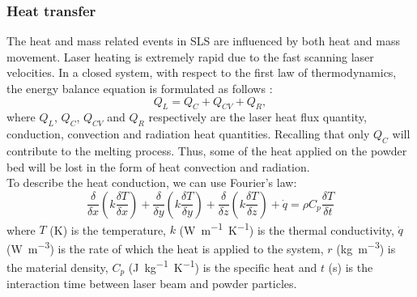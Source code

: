 \subsubsection{Heat transfer}
\label{sssec:heattransfer}
The heat and mass related events in SLS are influenced by both heat and mass movement. Laser heating is extremely rapid due to the fast scanning laser velocities. In a closed system, with respect to the first law of thermodynamics, the energy balance equation is formulated as follows \cite{bouabbou_understanding_2022}:
\begin{equation}
    \label{eq:tutteQ}
    Q_L = Q_C + Q_{CV} + Q_R,
\end{equation}
where $Q_L$, $Q_C$, $Q_{CV}$ and $Q_R$ respectively are the laser heat flux quantity, conduction, convection and radiation heat quantities. Recalling that only $Q_C$ will contribute to the melting process. Thus, some of the heat applied on the powder bed will be lost in the form of heat convection and radiation. \\
To describe the heat conduction, we can use Fourier's law:
\begin{equation}
    \label{eq:nonsiecapitouncazzo}
    \frac{\delta}{\delta x}\left(k \frac{\delta T}{\delta x}\right)+\frac{\delta}{\delta y}\left(k \frac{\delta T}{\delta y}\right)+\frac{\delta}{\delta z}\left(k \frac{\delta T}{\delta z}\right)+\dot{q} =\rho C_p \frac{\delta T}{\delta t}
\end{equation}
where $T$ (\unit{\kelvin}) is the temperature, $k$ (\unit{\watt.\metre^{-1}.\kelvin^{-1}}) is the thermal conductivity, $\dot{q}$ (\unit{\watt.\metre^{-3}}) is the rate of which the heat is applied to the system, $r$ (\unit{\kilo\gram.\metre^{-3}}) is the material density, $C_p$ (\unit{\joule. \kilo\gram^{-1}.\kelvin^{-1}}) is the specific heat and $t$ (\unit{\second}) is the interaction time between laser beam and powder particles.

